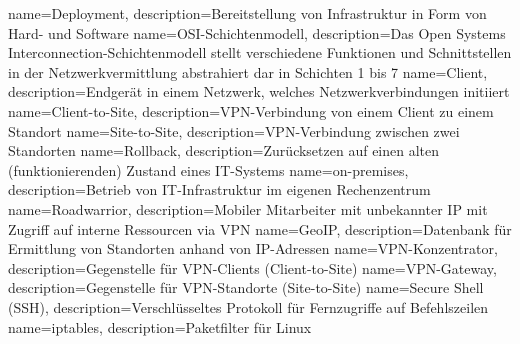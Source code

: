 {
        name=Deployment,
        description={Bereitstellung von Infrastruktur in Form von Hard- und Software}
}
{
        name=OSI-Schichtenmodell,
        description={Das Open Systems Interconnection-Schichtenmodell stellt verschiedene Funktionen und Schnittstellen in der Netzwerkvermittlung abstrahiert dar in Schichten 1 bis 7}
}
{
        name=Client,
        description={Endgerät in einem Netzwerk, welches Netzwerkverbindungen initiiert}
}
{
        name=Client-to-Site,
        description={VPN-Verbindung von einem Client zu einem Standort}
}
{
        name=Site-to-Site,
        description={VPN-Verbindung zwischen zwei Standorten}
}
{
        name=Rollback,
        description={Zurücksetzen auf einen alten (funktionierenden) Zustand eines IT-Systems}
}
{
        name=on-premises,
        description={Betrieb von IT-Infrastruktur im eigenen Rechenzentrum}
}
{
        name=Roadwarrior,
        description={Mobiler Mitarbeiter mit unbekannter IP mit Zugriff auf interne Ressourcen via VPN}
}
{
        name=GeoIP,
        description={Datenbank für Ermittlung von Standorten anhand von IP-Adressen}
}
{
        name=VPN-Konzentrator,
        description=Gegenstelle für VPN-Clients (Client-to-Site)
}
{
        name=VPN-Gateway,
        description=Gegenstelle für VPN-Standorte (Site-to-Site)
}
{
        name=Secure Shell (SSH),
        description=Verschlüsseltes Protokoll für Fernzugriffe auf Befehlszeilen
} 
{
        name=iptables,
        description=Paketfilter für Linux
} 
\glsunsetall